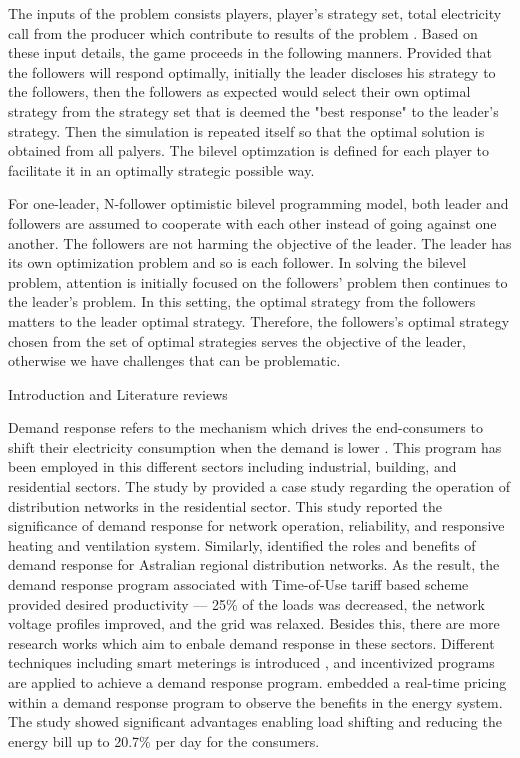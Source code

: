 \documentclass[a4paper]{article}
\begin{document}
The inputs of the problem consists players, player's strategy set, total electricity call from the producer which contribute to results of the problem \cite{yu2016}.
Based on these input details, the game proceeds in the following manners. 
Provided that the followers will respond optimally, initially the leader discloses his strategy to the followers, then the followers as expected would select their own optimal strategy from the strategy set that is deemed the "best response" to the leader's strategy.
Then the simulation is repeated itself so that the optimal solution is obtained from all palyers.
The bilevel optimzation is defined for each player to facilitate it in an optimally strategic possible way.

For one-leader, N-follower optimistic bilevel programming model, both leader and followers are assumed to cooperate with each other instead of going against one another.
The followers are not harming the objective of the leader.
The leader has its own optimization problem and so is each follower.
In solving the bilevel problem, attention is initially focused on the followers' problem then continues to the leader's problem.
In this setting, the optimal strategy from the followers matters to the leader optimal strategy.
Therefore, the followers's optimal strategy chosen from the set of optimal strategies serves the objective of the leader, otherwise we have challenges that can be problematic.

\newpage
{\red Introduction and Literature reviews} 

Demand response refers to the mechanism which drives the end-consumers to shift their electricity consumption when the demand is lower \cite{MORALESESPANA2022122544, oconnell2014benefits, PATERAKIS2017871}.
This program has been employed in this different sectors including industrial, building, and residential sectors.
The study by \citet{Amir6719589} provided a case study regarding the operation of distribution networks in the residential sector.
This study reported the significance of demand response for network operation, reliability, and responsive heating and ventilation system.
Similarly, \citet{amin2023demand} identified the roles and benefits of demand response for Astralian regional distribution networks.
As the result, the demand response program associated with Time-of-Use tariff based scheme provided desired productivity --- 25\% of the loads was decreased, the network voltage profiles improved, and the grid was relaxed.
Besides this, there are more research works which aim to enbale demand response in these sectors.
Different techniques including smart meterings is introduced \cite{sameer7931852}, and incentivized programs are applied to achieve a demand response program\cite{digiorgio2014,EID201615,Yu8972269}.
\citet{yu2016} embedded a real-time pricing within a demand response program to observe the benefits in the energy system.
The study showed significant advantages enabling load shifting and reducing the energy bill up to 20.7\% per day for the consumers.
\end{document}
